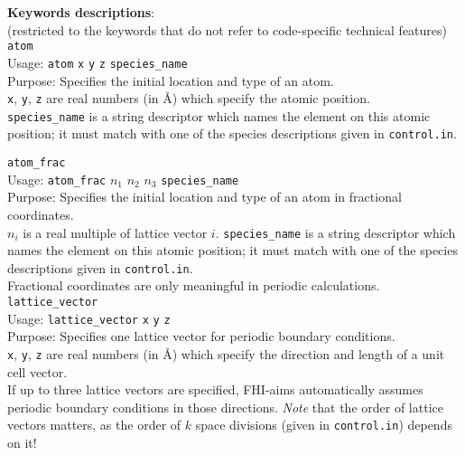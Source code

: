 \documentclass[11pt,letterpaper]{article}
\begin{document}
\noindent
\textbf{Keywords descriptions}: \\
(restricted to the keywords that do not refer to code-specific
technical features)
\\[1.0ex]

\texttt{atom} \\[1.0ex]
{
  \noindent
  Usage: \texttt{atom} \texttt{x} \texttt{y} \texttt{z}
  \texttt{species\_name} \\[1.0ex]
  Purpose: Specifies the initial location and type of an atom. \\[1.0ex]
  \texttt{x}, \texttt{y}, \texttt{z} are real numbers (in \AA) which
  specify the atomic position. \\[1.0ex]
  \texttt{species\_name} is a string descriptor which names the element on
    this atomic position; it must match with one of the species descriptions
    given in \texttt{control.in}. \\[1.0ex]
}

\texttt{atom\_frac} \\[1.0ex]
{
  \noindent
  Usage: \texttt{atom\_frac} \texttt{$n_1$} \texttt{$n_2$} \texttt{$n_3$}
  \texttt{species\_name} \\[1.0ex]
  Purpose: Specifies the initial location and type of an atom in fractional coordinates. \\[1.0ex]
  \texttt{$n_i$} is a real multiple of lattice vector $i$.
  \texttt{species\_name} is a string descriptor which names the element on
    this atomic position; it must match with one of the species descriptions
    given in \texttt{control.in}. \\[1.0ex]
}
Fractional coordinates are only meaningful in periodic calculations. \\[1.0ex]

\texttt{lattice\_vector} \\[1.0ex]
{
  \noindent
  Usage: \texttt{lattice\_vector} \texttt{x} \texttt{y} \texttt{z} \\[1.0ex]
  Purpose: Specifies one lattice vector for periodic boundary conditions. \\[1.0ex]
  \texttt{x}, \texttt{y}, \texttt{z} are real numbers (in \AA) which
  specify the direction and length of a unit cell vector. \\[1.0ex]
}
If up to three lattice vectors are specified, FHI-aims automatically assumes
periodic boundary conditions in those directions. \emph{Note} that the
order of lattice vectors matters, as the order of $k$ space divisions (given
in \texttt{control.in}) depends on it! \\[1.0ex]
\end{document}
